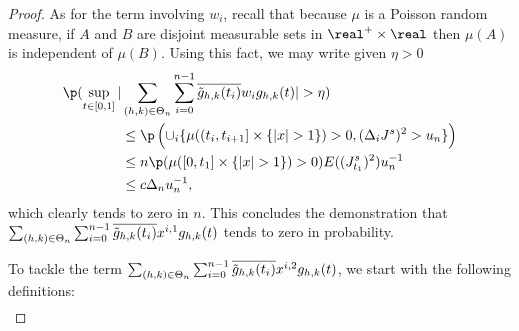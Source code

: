 \begin{proof}
As for the term involving $w_i$,   recall  that because $\mu$ is a Poisson random measure, if $A$ and  $B$ are disjoint measurable sets  in $\real^+\times \real$    then $\mu(A)$ is independent of $\mu(B)$. Using this fact, we may write  given $\eta > 0$    
\begin{align} 
  \p( \sup_{t \in \domain}\vert &\sumt \sumin \btghki w_i \ghk(t)\vert > \eta) \notag \\
  &\le \p\left(\cup_i\{\mu( (t_i, t_{i + 1}] \times \{\vert x \vert > 1\}) > 0   , (\djt)^2 > u_n\}\right) \notag \\ 
  & \le n \p(\mu( [0, t_1] \times \{\vert x \vert > 1\}) > 0 ) E( ( J^s_{t_1})^2) u_n^{-1} \notag \\ 
  & \le c \Delta_n u_n^{-1}\notag,
\end{align} 
which clearly tends to zero in $n$. This concludes the demonstration that $ \sum_{(h,k) \in \Theta_n} \sum_{i = 0}^{n-1} \overline{\tilde{g}_{h,k}(t_i)} x^{i,1} g_{h,k}(t)$ tends to zero in probability.  
  \begin{comment}
\p(v_n > \delta /2) & \le 2cKH^n\delta^{-1}E(n^{-1} \log(n) \sumin I_{\{(\djt)^2 > u_n\}}) + \p(\Lambda > K) \notag  \\ & = 2cK H^n\delta^{-1}\log(n) \p( (\Delta_{1/n}J^s)^2 > u_n)  + \varepsilon/2 \notag \\ &\le  2cK H^n\delta^{-1}\log(n) E((\Delta_{1/n} J^s)^2))u_n^{-1}   + \varepsilon/2 \notag \\ &\le 2cKH^n\delta^{-1} \log(n) n^{-1}\kappa u_n^{-1} +  \varepsilon/2\label{eq:asabove} \end{align} where $\kappa := E((\Delta_1 J^s)^2)) < \infty$.  Obviously there is a large enough $n$ such that the first expression above is less than or equal to $\varepsilon/2$.
\end{comment}
\begin{comment} Moreover, because $\delta >  0$,  \begin{align} \p(w_n > \delta/2) & \le \p\left(\cup_i\{I_{\{\vert x \vert > 1\}}\ast \mu( (t_i, t_{i + 1}] \times \real) > 0   , (\djt)^2 > u_n\}\right) \notag \\ & \le n \p(\mu( [0, 1/n] \times \{\vert x \vert > 1\}) > 0 ) E( (\Delta_1 J^s)^2) u_n^{-1} \notag \\ & \le c n^{-1} \kappa u_n^{-1}\notag,\end{align} which clearly tends to zero in $n$. 
\end{comment}
To tackle the term $ \sum_{(h,k) \in \Theta_n} \sum_{i = 0}^{n-1} \overline{\tilde{g}_{h,k}(t_i)} x^{i,2} g_{h,k}(t)$, we start with the following definitions:
\begin{align}

\end{align}
\end{proof}
